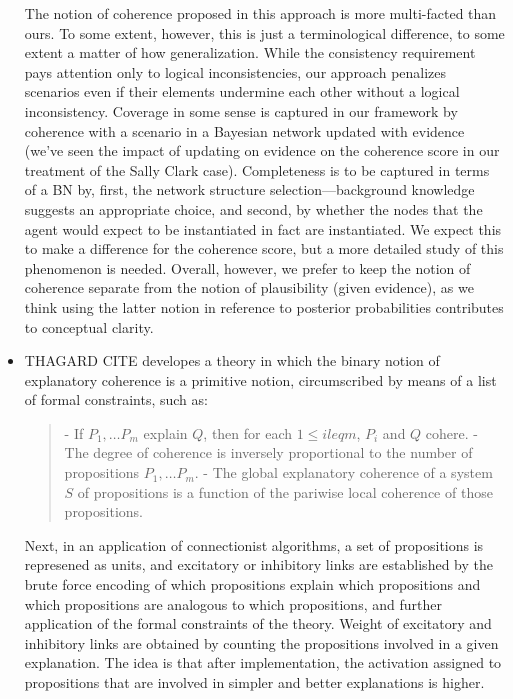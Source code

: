 \documentclass[10pt,]{scrartcl}
\begin{document}
\begin{itemize}
{ The notion of coherence proposed in this approach is more multi-facted than ours. To some extent, however, this is just a terminological difference, to some extent a matter of how generalization. While the consistency requirement pays attention only to logical inconsistencies, our approach  penalizes scenarios even if their elements undermine each other without a logical inconsistency. Coverage in some sense is captured in our framework by coherence with a scenario in a Bayesian network updated with evidence (we've seen the impact of updating on evidence on the coherence score in our treatment of the Sally Clark case). Completeness is to be captured in terms of a BN by, first, the network structure selection---background knowledge suggests an appropriate choice, and second, by whether the nodes that the agent would expect to be instantiated in fact are instantiated. We expect this to make a difference for the coherence score, but a more detailed study of this phenomenon is needed. Overall, however, we prefer to keep the notion of coherence separate from the notion of plausibility (given evidence), as we think using the latter notion in reference to posterior probabilities contributes to  conceptual clarity.}




\item{ THAGARD CITE developes a theory in which the binary notion of explanatory coherence is a primitive notion, circumscribed by means of a list of formal constraints, such as:

\begin{quote}
- If $P_1, \dots P_m$ explain $Q$, then for each $1\leq i leq m$, $P_i$ and $Q$ cohere.
- The degree of coherence is inversely proportional to the number of propositions $P_1, 
\dots P_m$.
- The global explanatory coherence of a system $S$ of propositions is a function of the pariwise local coherence of those propositions.
\end{quote}

Next, in an application of connectionist algorithms, a set of propositions is represened as units, and excitatory or inhibitory links are established by the brute force encoding of which propositions explain which propositions and which propositions are analogous to which propositions, and further application of the formal constraints of the theory. Weight of excitatory and inhibitory links are obtained by counting the propositions involved in a given explanation. The idea is that after implementation, the activation assigned to propositions that are involved in simpler and better explanations is higher. 



}
\end{itemize}
\end{document}
